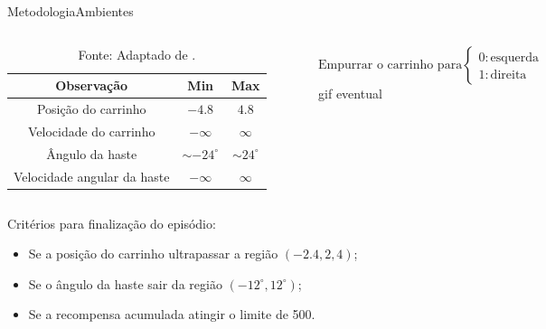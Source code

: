 \documentclass[
11pt,notheorems,hyperref={pdfauthor=Autor}
]{beamer}
\begin{document}
\begin{frame}{Metodologia}{Ambientes}
\begin{columns}[T]
    \pause
    \begin{table}[h!]
    \centering
    \caption{Observações do ambiente \textit{CartPole}}
    \begin{tabular}{ccc}
    \hline
    \textbf{Observação} & \textbf{Min} & \textbf{Max} \\
    \hline
    Posição do carrinho& $-4.8$&$ 4.8$ \\
    Velocidade do carrinho& $-\infty$ & $\infty$ \\
    Ângulo da haste& $\sim -24^\circ$& $\sim 24^\circ$\\
    Velocidade angular da haste& $-\infty$ & $\infty$\\
    \hline
    \end{tabular}
    \caption*{Fonte: Adaptado de \textcite{towers_gymnasium_2023}.}
    \end{table}
    \vspace{0.25cm}
    \pause
    \begin{equation*}
    \text{Empurrar o carrinho para}
        \begin{cases}
            0: \text{esquerda}
            \\
            1: \text{direita}
        \end{cases}
    \end{equation*}
    \vspace{0.25cm}
    \pause
    gif eventual
\end{columns}
\pause
Critérios para finalização do episódio:
\pause
\begin{itemize}
    \item Se a posição do carrinho ultrapassar a região $(-2.4,2,4)$; \pause
    \item Se o ângulo da haste sair da região $(-12^\circ, 12^\circ)$; \pause
    \item Se a recompensa acumulada atingir o limite de 500.
\end{itemize}
\end{frame}
\end{document}
